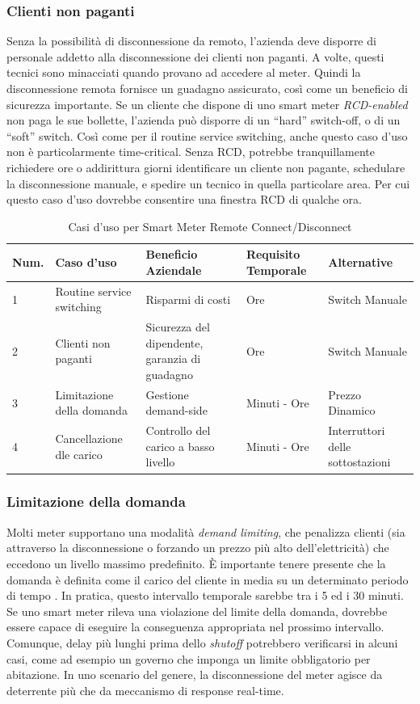\subsubsection{Clienti non paganti}
Senza la possibilità di disconnessione da remoto, l'azienda deve disporre di personale addetto alla disconnessione dei clienti non paganti. A volte, questi tecnici sono minacciati quando provano ad accedere al meter. Quindi la disconnessione remota fornisce un guadagno assicurato, così come un beneficio di sicurezza importante. Se un cliente che dispone di uno smart meter \emph{RCD-enabled} non paga le sue bollette, l'azienda può disporre di un ``hard'' switch-off, o di un ``soft'' switch. Così come per il routine service switching, anche questo caso d'uso non è particolarmente time-critical. Senza RCD, potrebbe tranquillamente richiedere ore o addirittura giorni identificare un cliente non pagante, schedulare la disconnessione manuale, e spedire un tecnico in quella particolare area. Per cui questo caso d'uso dovrebbe consentire una finestra RCD di qualche ora.
\begin{table}[hbtp]
	\centering
	\begin{adjustbox}{max width=\textwidth}
		\begin{tabular}{|l|l|l|l|l|}
			\hline
			Num. & Caso d'uso & Beneficio Aziendale & Requisito Temporale & Alternative \\ \hline
			1 & Routine service switching & Risparmi di costi & Ore & Switch Manuale \\ \hline
			2 & Clienti non paganti & Sicurezza del dipendente, garanzia di guadagno & Ore & Switch Manuale\\ \hline
			3 & Limitazione della domanda & Gestione demand-side & Minuti - Ore & Prezzo Dinamico\\ \hline
			4 & Cancellazione dle carico & Controllo del carico a basso livello & Minuti - Ore & Interruttori delle sottostazioni\\ \hline
		\end{tabular}
	\end{adjustbox}
	\caption{Casi d'uso per Smart Meter Remote Connect/Disconnect}
	\label{tab:usecases}
\end{table}
\subsubsection{Limitazione della domanda}
Molti meter supportano una modalità \emph{demand limiting}, che penalizza clienti (sia attraverso la disconnessione o forzando un prezzo più alto dell'elettricità) che eccedono un livello massimo predefinito. È importante tenere presente che la domanda è definita come il carico del cliente in media su un determinato periodo di tempo \cite{demand}. In pratica, questo intervallo temporale sarebbe tra i 5 ed i 30 minuti. Se uno smart meter rileva una violazione del limite della domanda, dovrebbe essere capace di eseguire la conseguenza appropriata nel prossimo intervallo. Comunque, delay più lunghi prima dello \emph{shutoff} potrebbero verificarsi in alcuni casi, come ad esempio un governo che imponga un limite obbligatorio per abitazione. In uno scenario del genere, la disconnessione del meter agisce da deterrente più che da meccanismo di response real-time.
